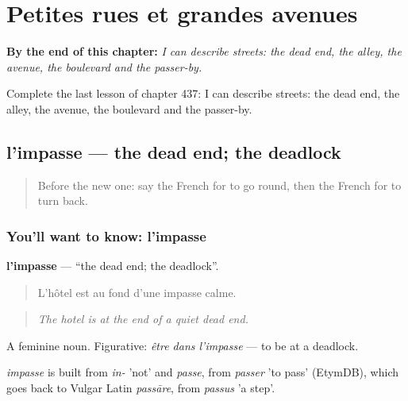 
\chapter{Petites rues et grandes avenues}
\label{ch:fr-petites-rues-et-grandes-avenues}

\begin{chapteropening}
\textbf{By the end of this chapter:} \emph{I can describe streets: the dead end, the alley, the avenue, the boulevard and the passer-by.}

Complete the last lesson of chapter 437: I can describe streets: the dead end, the alley, the avenue, the boulevard and the passer-by.
\end{chapteropening}

\section[l'impasse]{l'impasse — the dead end; the deadlock}

\label{lesson:FR-C437-impasse}



\begin{quote}
Before the new one: say the French for to go round, then the French for to turn back.
\end{quote}

\subsection*{You'll want to know: l'impasse}
\textbf{l'impasse} — \textquotedblleft{}the dead end; the deadlock\textquotedblright{}.

\begin{quote}
L'hôtel est au fond d'une impasse calme.
\end{quote}

\begin{quote}
\emph{The hotel is at the end of a quiet dead end.}
\end{quote}

A feminine noun. Figurative: \emph{être dans l'impasse} — to be at a deadlock.

\begin{cousinweb}
\emph{impasse} is built from \emph{in-} 'not' and \emph{passe}, from \emph{passer} 'to pass' (EtymDB), which goes back to Vulgar Latin \emph{passāre}, from \emph{passus} 'a step'.
\end{cousinweb}

